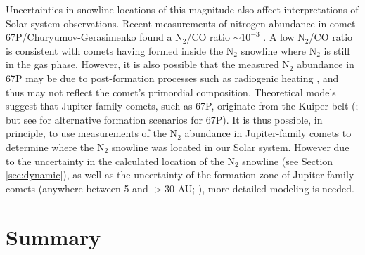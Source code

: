 \documentclass[apj]{emulateapj}
\begin{document}

Uncertainties in snowline locations of this magnitude also affect interpretations of Solar system observations. Recent measurements of nitrogen abundance in comet 67P/Churyumov-Gerasimenko found a N$_2$/CO ratio $\sim 10^{-3}$ \citep{rubin15}. A low N$_2$/CO ratio is consistent with comets having formed inside the N$_2$ snowline where N$_2$ is still in the gas phase. However, it is also possible that the measured N$_2$ abundance in 67P may be due to post-formation processes such as radiogenic heating \citep{rubin15}, and thus may not reflect the comet's primordial composition. Theoretical models suggest that Jupiter-family comets, such as 67P, originate from the Kuiper belt (\citealt{duncan97}; but see \citealt{rubin15} for alternative formation scenarios for 67P). It is thus possible, in principle, to use measurements of the N$_2$ abundance in Jupiter-family comets to determine where the N$_2$ snowline was located in our Solar system. However due to the uncertainty in the calculated location of the N$_2$ snowline (see Section \ref{sec:dynamic}), as well as the uncertainty of the formation zone of Jupiter-family comets (anywhere between 5 and $>$30 AU; \citealt{pontoppidan14}), more detailed modeling is needed. 



\section{Summary}
\label{sec:summary}
\end{document}
